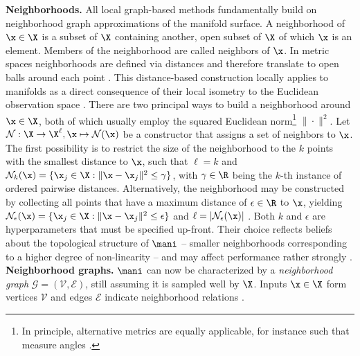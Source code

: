 \textbf{Neighborhoods.} All local graph-based methods fundamentally 
build on neighborhood graph approximations of the manifold surface.
A neighborhood of $\x \in \X$ is a subset of $\X$ containing another, open 
subset of $\X$ of which $\x$ is an element.
Members of the neighborhood are called neighbors of $\x$.
In metric spaces neighborhoods are defined via distances and therefore 
translate to open balls around each point \citep{waldmann2014}.
This distance-based construction locally applies to manifolds as a direct 
consequence of their local isometry to the Euclidean observation space 
\citep{mafu2011}.
There are two principal ways to build a neighborhood around $\x \in \X$, 
both of which usually employ the squared Euclidean norm\footnote{
In principle, alternative metrics are equally applicable, for instance such 
that measure angles \citep{belkinniyogi2004}.
} $\| \cdot \|^2$.
Let $\mathcal{N}: \X \rightarrow \X^{\ell}, \x \mapsto \mathcal{N} (\x)$ be a 
constructor that assigns a set of neighbors to $\x$.
The first possibility is to restrict the size of the neighborhood to the $k$ 
points with the smallest distance to $\x$, such that
$\ell = k$ and $\mathcal{N}_k(\x) = \{\x_j \in \X: 
\| \x - \x_j \|^2 \leq \gamma\}$, with $\gamma \in \R$ being the $k$-th instance 
of ordered pairwise distances.
Alternatively, the neighborhood may be constructed by collecting all points that
have a maximum distance of $\epsilon \in \R$ to $\x$, yielding 
$\mathcal{N}_{\epsilon} (\x) = 
\{\x_j \in \X: \| \x - \x_j \|^2 \leq \epsilon\}$ and 
$\ell = |\mathcal{N}_{\epsilon} (\x)|$ \citep{heetal2005}.
Both $k$ and $\epsilon$ are hyperparameters that must be specified up-front.
Their choice reflects beliefs about the topological structure of $\mani$ -- 
smaller neighborhoods corresponding to a higher degree of non-linearity -- and 
may affect performance rather strongly \citep{sudderth2002}.
\\

\textbf{Neighborhood graphs.}
$\mani$ can now be characterized by a \textit{neighborhood 
graph} $\mathcal{G} = (\mathcal{V}, \mathcal{E})$, still assuming it is 
sampled well by $\X$. 
Inputs $\x \in \X$ form vertices $\mathcal{V}$ and edges $\mathcal{E}$ 
indicate neighborhood relations \citep{belkinniyogi2001}.

